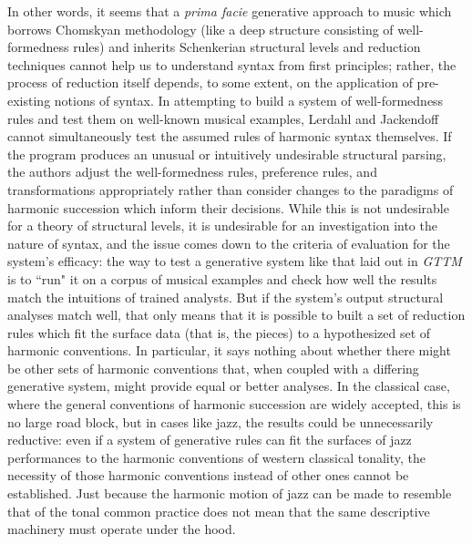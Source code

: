 In other words, it seems that a \emph{prima facie} generative approach to music which borrows Chomskyan methodology (like a deep structure consisting of well-formedness rules) and inherits Schenkerian structural levels and reduction techniques cannot help us to understand syntax from first principles; rather, the process of reduction itself depends, to some extent, on the application of pre-existing notions of syntax.  In attempting to build a system of well-formedness rules and test them on well-known musical examples, Lerdahl and Jackendoff cannot simultaneously test the assumed rules of harmonic syntax themselves.  If the program produces an unusual or intuitively undesirable structural parsing, the authors adjust the well-formedness rules, preference rules, and transformations appropriately rather than consider changes to the paradigms of harmonic succession which inform their decisions.  While this is not undesirable for a theory of structural levels, it is undesirable for an investigation into the nature of syntax, and the issue comes down to the criteria of evaluation for the system's efficacy: the way to test a generative system like that laid out in \emph{GTTM} is to ``run" it on a corpus of musical examples and check how well the results match the intuitions of trained analysts.  But if the system's output structural analyses match well, that only means that it is possible to built a set of reduction rules which fit the surface data (that is, the pieces) to a hypothesized set of harmonic conventions.  In particular, it says nothing about whether there might be other sets of harmonic conventions that, when coupled with a differing generative system, might provide equal or better analyses.  In the classical case, where the general conventions of harmonic succession are widely accepted, this is no large road block, but in cases like jazz, the results could be unnecessarily reductive: even if a system of generative rules can fit the surfaces of jazz performances to the harmonic conventions of western classical tonality, the necessity of those harmonic conventions instead of other ones cannot be established.  Just because the harmonic motion of jazz can be made to resemble that of the tonal common practice does not mean that the same descriptive machinery must operate under the hood.  

